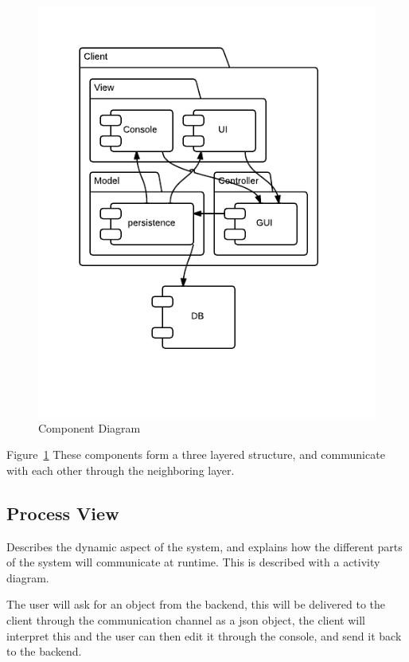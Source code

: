 \begin{figure}
\centering
\includegraphics[width=6in]{image/ComponentDiagram.png}
\caption{Component Diagram}
\label{figure:componentDiagram}
\end{figure}

Figure~\ref{figure:componentDiagram} These components form a three layered structure, and communicate with each other through the neighboring layer.


\subsection{Process View}
Describes the dynamic aspect of the system, and explains how the different parts of the system will communicate at runtime. This is described with a activity diagram.

The user will ask for an object from the backend, this will be delivered to the client through the communication channel as a json object, the client will interpret this and the user can then edit it through the console, and send it back to the backend.



